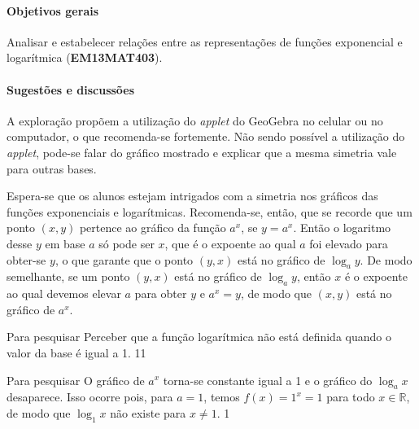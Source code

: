 \cleardoublepage
\def\currentcolor{session1}
\begin{texto}
{
	\paragraph{Objetivos gerais}
	Analisar e estabelecer relações entre as representações de funções exponencial e logarítmica (\textbf{EM13MAT403}).

	\paragraph{Sugestões e discussões}
	A exploração propõem a utilização do \textit{applet} do GeoGebra no celular ou no computador, o que recomenda-se fortemente. Não sendo possível a utilização do \textit{applet}, pode-se falar do gráfico mostrado e explicar que a mesma simetria vale para outras bases.

	Espera-se que os alunos estejam intrigados com a simetria nos gráficos das funções exponenciais e logarítmicas. Recomenda-se, então, que se recorde que um ponto $(x,y)$ pertence ao gráfico da função $a^x$, se $y=a^x$. Então o logaritmo desse $y$ em base $a$ só pode ser $x$, que é o expoente ao qual $a$ foi elevado para obter-se $y$, o que garante que o ponto $(y,x)$ está no gráfico de $\log_a y$. De modo semelhante, se um ponto $(y,x)$ está no gráfico de $\log_a y$, então $x$ é o expoente ao qual devemos elevar $a$ para obter $y$ e $a^x=y$, de modo que $(x,y)$ está no gráfico de $a^x$.
}
\end{texto}
\begin{objectives}{Para pesquisar}
{
	Perceber que a função logarítmica não está definida quando o valor da base é igual a 1.
}{1}{1}
\end{objectives}
\begin{answer}{Para pesquisar}
{
	O gráfico de $a^x$ torna-se constante igual a 1 e o gráfico do $\log_a x$ desaparece. Isso ocorre pois, para $a=1$, temos $f(x)=1^x =1$ para todo $x \in \mathbb{R}$, de modo que $\log_1 x$ não existe para $x \neq 1$.
}{1}
\end{answer}
\clearmargin
